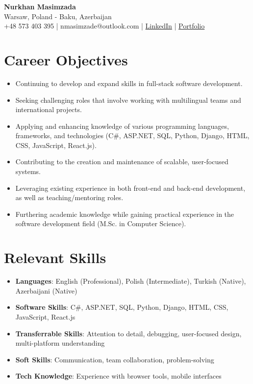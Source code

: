 \documentclass[11pt,a4paper]{article}
\begin{document}
\begin{center}
    {\Large \textbf{Nurkhan Masimzada}} \\
     Warsaw, Poland - Baku, Azerbaijan \\
    +48 573 403 395 | nmasimzade@outlook.com | \href{https://www.linkedin.com/in/nurkhan-masimzada-123456789/}{LinkedIn} | \href{https://nurkhanmasimzada.site}{Portfolio}
\end{center}

\section*{Career Objectives}
\begin{itemize}[leftmargin=*]
    \item Continuing to develop and expand skills in full-stack software development.
    \item Seeking challenging roles that involve working with multilingual teams and international projects.
    \item Applying and enhancing knowledge of various programming languages, frameworks, and technologies (C\#, ASP.NET, SQL, Python, Django, HTML, CSS, JavaScript, React.js).
    \item Contributing to the creation and maintenance of scalable, user-focused systems.
    \item Leveraging existing experience in both front-end and back-end development, as well as teaching/mentoring roles.
    \item Furthering academic knowledge while gaining practical experience in the software development field (M.Sc. in Computer Science).
\end{itemize}

\section*{Relevant Skills}
\begin{itemize}[leftmargin=*]
    \item \textbf{Languages}: English (Professional), Polish (Intermediate), Turkish (Native),  Azerbaijani (Native)
    \item \textbf{Software Skills}: C\#, ASP.NET, SQL, Python, Django, HTML, CSS, JavaScript, React.js
    \item \textbf{Transferrable Skills}: Attention to detail, debugging, user-focused design, multi-platform understanding
    \item \textbf{Soft Skills}: Communication, team collaboration, problem-solving
    \item \textbf{Tech Knowledge}: Experience with browser tools, mobile interfaces
\end{itemize}
\end{document}
